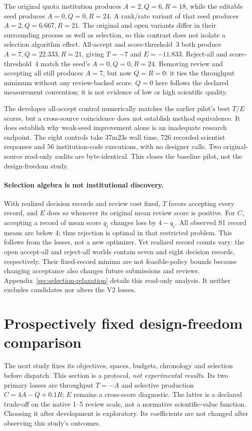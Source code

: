 \documentclass{article}
\begin{document}
The original quota institution produces $A=2,Q=6,R=18$, while the editable
seed produces $A=0,Q=0,R=24$. A rank/rate variant of that seed produces
$A=2,Q=6.667,R=21$. The original and open variants differ in their surrounding
process as well as selection, so this contrast does not isolate a selection
algorithm effect. All-accept and score-threshold~3 both produce
$A=7,Q=22.333,R=21$, giving $T=-7$ and $E=-11.833$. Reject-all and
score-threshold~4 match the seed's $A=0,Q=0,R=24$. Removing review and accepting
all still produces $A=7$, but now $Q=R=0$: it ties the throughput minimum
without any review-backed score. $Q=0$ here follows the declared measurement
convention; it is not evidence of low or high scientific quality.

The developer all-accept control numerically matches the earlier pilot's best
$T/E$ scores, but a cross-source coincidence does not establish method
equivalence. It does establish why weak-seed improvement alone is an inadequate
research endpoint. The eight controls take 37m23s wall time, 726 recorded
scientist responses and 56 institution-code executions, with no designer calls.
Two original-source read-only audits are byte-identical. This closes the
baseline pilot, not the design-freedom study.

\paragraph{Selection algebra is not institutional discovery.}
With realized decision records and review cost fixed, $T$ favors accepting
every record, and $E$ does so whenever its original mean review score is
positive. For $C$, accepting a record of mean score $q_i$ changes loss by
$4-q_i$. All observed S1 record means are below 4; thus rejection is optimal
in that restricted problem. This follows from the losses, not a new optimizer.
Yet realized record counts vary: the open accept-all and reject-all worlds
contain seven and eight decision records, respectively. Their fixed-record
minima are not feasible-policy bounds because changing acceptance also changes
future submissions and reviews. Appendix~\ref{sec:selection-relaxation} details
this read-only analysis. It neither excludes candidates nor alters the V2 losses.

\section{Prospectively fixed design-freedom comparison}
\label{sec:prospective}
The next study fixes its objectives, spaces, budgets, chronology and selection
before dispatch. This section is a protocol, \emph{not experimental results}.
Its two primary losses are throughput $T=-A$ and selective production
$C=4A-Q+0.1R$; $E$ remains a cross-score diagnostic. The latter is a declared
trade-off on the native 1--5 review scale, not a normative scientific-value
function. Choosing it after development is exploratory. Its coefficients are
not changed after observing this study's outcomes.
\end{document}
